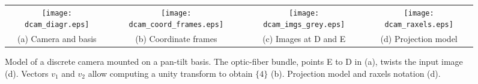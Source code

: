 \begin{figure*}[!ht]
\centering
\begin{tabular}{cccc}
\texttt{[image: dcam\_diagr.eps]} &
\hspace{0.5cm}
\texttt{[image: dcam\_coord\_frames.eps]} &
\hspace{1cm}
\texttt{[image: dcam\_imgs\_grey.eps]} &
\hspace{1cm}
\texttt{[image: dcam\_raxels.eps]} \\
(a) Camera and basis & (b) Coordinate frames & (c) Images at D and E & (d) Projection model \\
\end{tabular}
\caption{Model of a discrete camera mounted on a pan-tilt basis. The optic-fiber bundle, points E to D in (a), twists the input image (d). Vectors $v_1$ and $v_2$ allow computing a unity transform to obtain $\{4\}$ (b). Projection model and raxels notation (d).}
\label{fig:setup}
\end{figure*}
